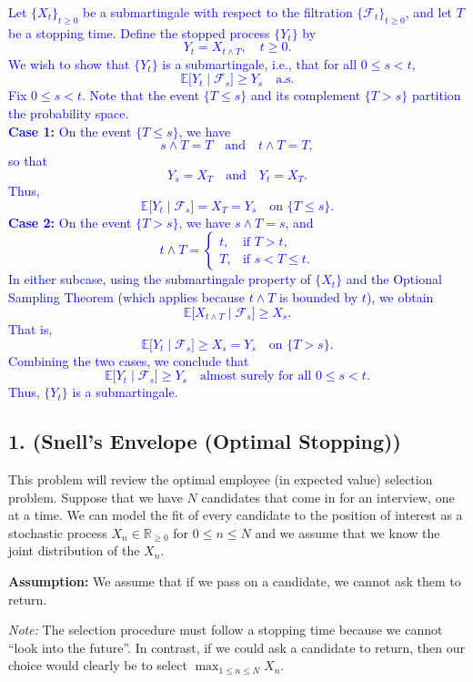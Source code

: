 \documentclass{article}
\begin{document}
\textcolor{blue}{
    Let $\{X_t\}_{t\ge 0}$ be a submartingale with respect to the filtration $\{\mathcal{F}_t\}_{t\ge 0}$, and let $T$ be a stopping time. Define the stopped process $\{Y_t\}$ by
\[
Y_t = X_{t\wedge T}, \quad t\ge 0.
\]
We wish to show that $\{Y_t\}$ is a submartingale, i.e., that for all $0\le s < t$,
\[
\mathbb{E}\bigl[Y_t \mid \mathcal{F}_s\bigr] \ge Y_s \quad \text{a.s.}
\]
Fix $0\le s < t$. Note that the event $\{T \le s\}$ and its complement $\{T > s\}$ partition the probability space. \\ 
\textbf{Case 1:} On the event $\{T\le s\}$, we have
\[
s\wedge T = T \quad \text{and} \quad t\wedge T = T,
\]
so that
\[
Y_s = X_T \quad \text{and} \quad Y_t = X_T.
\]
Thus,
\[
\mathbb{E}\bigl[Y_t \mid \mathcal{F}_s\bigr] = X_T = Y_s \quad \text{on } \{T\le s\}.
\]
\textbf{Case 2:} On the event $\{T > s\}$, we have $s\wedge T = s$, and
\[
t\wedge T =
\begin{cases}
t, & \text{if } T > t, \\
T, & \text{if } s < T \le t.
\end{cases}
\]
In either subcase, using the submartingale property of $\{X_t\}$ and the Optional Sampling Theorem (which applies because $t\wedge T$ is bounded by $t$), we obtain
\[
\mathbb{E}\bigl[X_{t\wedge T}\mid\mathcal{F}_s\bigr] \ge X_s.
\]
That is,
\[
\mathbb{E}\bigl[Y_t\mid\mathcal{F}_s\bigr] \ge X_s = Y_s \quad \text{on } \{T > s\}.
\]
Combining the two cases, we conclude that
\[
\mathbb{E}\bigl[Y_t\mid\mathcal{F}_s\bigr] \ge Y_s \quad \text{almost surely for all } 0\le s < t.
\]
Thus, $\{Y_t\}$ is a submartingale.
}

\subsection*{1. (Snell’s Envelope (Optimal Stopping))}

This problem will review the optimal employee (in expected value) selection problem. Suppose that we have $N$ candidates that come in for an interview, one at a time. We can model the fit of every candidate to the position of interest as a stochastic process $X_n \in \mathbb{R}_{\geq 0}$ for $0 \leq n \leq N$ and we assume that we know the joint distribution of the $X_n$.

\textbf{Assumption:} We assume that if we pass on a candidate, we cannot ask them to return.

\textit{Note:} The selection procedure must follow a stopping time because we cannot ``look into the future''. In contrast, if we could ask a candidate to return, then our choice would clearly be to select $\max_{1 \leq n \leq N} X_n$.
\end{document}
